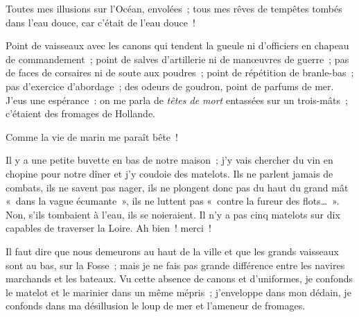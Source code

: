 \documentclass[french,twoside]{book} %
\def\mednobreak{\ifdim\lastskip<\medskipamount
  \removelastskip\nopagebreak\medskip\fi}
\newcommand{\labelblock}[1]{\medbreak{\noindent\color{rubric}\bfseries #1}\par\mednobreak}
\begin{document}
Toutes mes illusions sur l’Océan, envolées ; tous mes rêves de tempêtes tombés dans l’eau douce, car c’était de l’eau douce !\par
Point de vaisseaux avec les canons qui tendent la gueule ni d’officiers en chapeau de commandement ; point de salves d’artillerie ni de manœuvres de guerre ; pas de faces de corsaires ni de soute aux poudres ; point de répétition de branle-bas ; pas d’exercice d’abordage ; des odeurs de goudron, point de parfums de mer. J’eus une espérance : on me parla de \emph{têtes de mort} entassées sur un trois-mâts ; c’étaient des fromages de Hollande.\par
Comme la vie de marin me paraît bête !\par
Il y a une petite buvette en bas de notre maison ; j’y vais chercher du vin en chopine pour notre dîner et j’y coudoie des matelots. Ils ne parlent jamais de combats, ils ne savent pas nager, ils ne plongent donc pas du haut du grand mât « dans la vague écumante », ils ne luttent pas « contre la fureur des flots… ». Non, s’ils tombaient à l’eau, ils se noieraient. Il n’y a pas cinq matelots sur dix capables de traverser la Loire. Ah bien ! merci !\par
Il faut dire que nous demeurons au haut de la ville et que les grands vaisseaux sont au bas, sur la Fosse ; mais je ne fais pas grande différence entre les navires marchands et les bateaux. Vu cette absence de canons et d’uniformes, je confonds le matelot et le marinier dans un même mépris ; j’enveloppe dans mon dédain, je confonds dans ma désillusion le loup de mer et l’ameneur de fromages.\par

\labelblock{MON PROFESSEUR}
\end{document}
